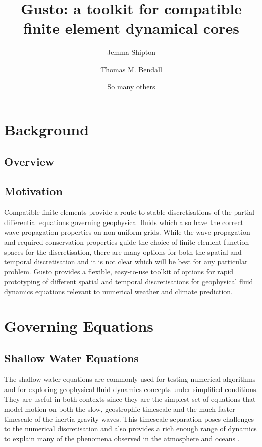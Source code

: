 \documentclass[11pt, a4paper]{article}
\begin{document}
\author[1,*]{Jemma Shipton}
\author[2]{Thomas M. Bendall}
\author[3]{So many others}


\title{Gusto: a toolkit for compatible finite element dynamical cores}
\date{}

\maketitle

\section{Background}

\subsection{Overview}

\subsection{Motivation}
Compatible finite elements provide a route to stable discretisations
of the partial differential equations governing geophysical fluids
which also have the correct wave propagation properties on non-uniform
grids. While the wave propagation and required conservation properties
guide the choice of finite element function spaces for the
discretisation, there are many options for both the spatial and
temporal discretisation and it is not clear which will be best for any
particular problem. Gusto provides a flexible, easy-to-use toolkit of
options for rapid prototyping of different spatial and temporal
discretisations for geophysical fluid dynamics equations relevant to
numerical weather and climate prediction.

\section{Governing Equations}

\subsection{Shallow Water Equations}
The shallow water equations are commonly used for testing numerical
algorithms and for exploring geophysical fluid dynamics concepts under
simplified conditions. They are useful in both contexts since they are
the simplest set of equations that model motion on both the slow,
geostrophic timescale and the much faster timescale of the
inertia-gravity waves. This timescale separation poses challenges to
the numerical discretisation and also provides a rich enough range of
dynamics to explain many of the phenomena observed in the atmosphere
and oceans \citep{zeitlin2018geophysical}.
\end{document}
